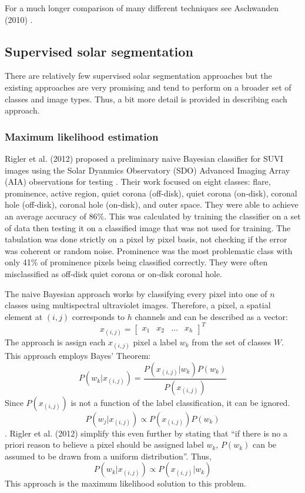 \documentclass[twoside]{report}
\begin{document}
For a much longer comparison of many different techniques see Aschwanden (2010) \cite{aschwanden:2010}. 

\subsection{Supervised solar segmentation} \label{sec:supervised}
There are relatively few supervised solar segmentation approaches but the existing approaches are very promising and tend to perform on a broader set of classes and image types. Thus, a bit more detail is provided in describing each approach. 

\subsubsection{Maximum likelihood estimation}\label{sec:riglermaxlikelihood}

Rigler et al. (2012) proposed a preliminary naive Bayesian classifier for SUVI images using the Solar Dyanmics Observatory (SDO) Advanced Imaging Array (AIA) observations for testing \cite{rigler:2012}. Their work focused on eight classes: flare, prominence, active region, quiet corona (off-disk), quiet corona (on-disk), coronal hole (off-disk), coronal hole (on-disk), and outer space. They were able to achieve an average accuracy of 86\%. This was calculated by training the classifier on a set of data then testing it on a classified image that was not used for training. The tabulation was done strictly on a pixel by pixel basis, not checking if the error was coherent or random noise. Prominence was the most problematic class with only 41\% of prominence pixels being classified correctly. They were often misclassified as off-disk quiet corona or on-disk coronal hole.

The naive Bayesian approach works by classifying every pixel into one of $n$ classes using multispectral ultraviolet images. Therefore, a pixel, a spatial element at $(i,j)$ corresponds to $h$ channels and can be described as a vector:
\[ x_{(i,j)} = \begin{bmatrix} x_1 & x_2 & \hdots & x_h \end{bmatrix}^T \]
The approach is assign each $x_{(i,j)}$ pixel a label $w_k$ from the set of classes $W$. This approach employs Bayes' Theorem:
\[ P(w_k | x_{(i,j)}) = \frac{P(x_{(i,j)} | w_k) P(w_k)}{P(x_{(i,j)})} \]
Since $P(x_{(i,j)})$ is not a function of the label classification, it can be ignored.
\[ P(w_j | x_{(i,j)}) \propto P(x_{(i,j)}) P(w_{k}) \].
Rigler et al. (2012) simplify this even further by stating that ``if there is no a priori reason to believe a pixel should be assigned label $w_k$, $P(w_k)$ can be assumed to be drawn from a uniform distribution''. Thus,
\[ P(w_k | x_{(i,j)}) \propto P(x_{(i,j)} | w_k) \]
This approach is the maximum likelihood solution to this problem.
\end{document}

